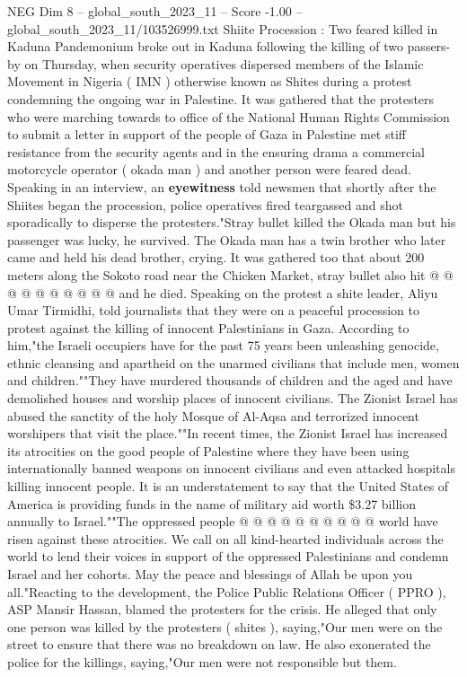 \begin{textsample}{NEG Dim 8 – global\_south\_2023\_11 – Score -1.00 – global\_south\_2023\_11/103526999.txt}  \label{ex:f8_neg_187}
Shiite Procession : Two feared killed in Kaduna Pandemonium broke out in Kaduna following the killing of two passers-by on Thursday, when security operatives dispersed members of the Islamic Movement in Nigeria ( IMN ) otherwise known as Shites during a protest condemning the ongoing war in Palestine.
It was gathered that the protesters who were marching towards to office of the National Human Rights Commission to submit a letter in support of the people of Gaza in Palestine met stiff resistance from the security agents and in the ensuring drama a commercial motorcycle operator ( okada man ) and another person were feared dead.
Speaking in an interview, an \textbf{eyewitness} told newsmen that shortly after the Shiites began the procession, police operatives fired teargassed and shot sporadically to disperse the protesters."Stray bullet killed the Okada man but his passenger was lucky, he survived.
The Okada man has a twin brother who later came and held his dead brother, crying.
It was gathered too that about 200 meters along the Sokoto road near the Chicken Market, stray bullet also hit @ @ @ @ @ @ @ @ @ @ and he died.
Speaking on the protest a shite leader, Aliyu Umar Tirmidhi, told journalists that they were on a peaceful procession to protest against the killing of innocent Palestinians in Gaza.
According to him,"the Israeli occupiers have for the past 75 years been unleashing genocide, ethnic cleansing and apartheid on the unarmed civilians that include men, women and children.""They have murdered thousands of children and the aged and have demolished houses and worship places of innocent civilians.
The Zionist Israel has abused the sanctity of the holy Mosque of Al-Aqsa and terrorized innocent worshipers that visit the place.""In recent times, the Zionist Israel has increased its atrocities on the good people of Palestine where they have been using internationally banned weapons on innocent civilians and even attacked hospitals killing innocent people.
It is an understatement to say that the United States of America is providing funds in the name of military aid worth \$3.27 billion annually to Israel.""The oppressed people @ @ @ @ @ @ @ @ @ @ world have risen against these atrocities.
We call on all kind-hearted individuals across the world to lend their voices in support of the oppressed Palestinians and condemn Israel and her cohorts.
May the peace and blessings of Allah be upon you all."Reacting to the development, the Police Public Relations Officer ( PPRO ), ASP Mansir Hassan, blamed the protesters for the crisis.
He alleged that only one person was killed by the protesters ( shites ), saying,"Our men were on the street to ensure that there was no breakdown on law.
He also exonerated the police for the killings, saying,"Our men were not responsible but them.

\end{textsample}
